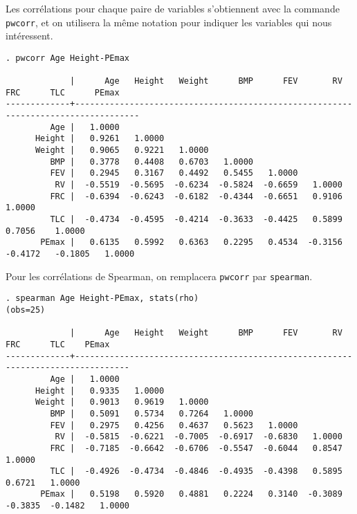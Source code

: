 Les corrélations pour chaque paire de variables s'obtiennent avec la
commande \texttt{pwcorr}, et on utilisera la même notation pour indiquer les
variables qui nous intéressent.
\begin{verbatim}
. pwcorr Age Height-PEmax

             |      Age   Height   Weight      BMP      FEV       RV      FRC      TLC      PEmax
-------------+-----------------------------------------------------------------------------------
         Age |   1.0000 
      Height |   0.9261   1.0000 
      Weight |   0.9065   0.9221   1.0000 
         BMP |   0.3778   0.4408   0.6703   1.0000 
         FEV |   0.2945   0.3167   0.4492   0.5455   1.0000 
          RV |  -0.5519  -0.5695  -0.6234  -0.5824  -0.6659   1.0000 
         FRC |  -0.6394  -0.6243  -0.6182  -0.4344  -0.6651   0.9106   1.0000 
         TLC |  -0.4734  -0.4595  -0.4214  -0.3633  -0.4425   0.5899   0.7056    1.0000 
       PEmax |   0.6135   0.5992   0.6363   0.2295   0.4534  -0.3156  -0.4172   -0.1805   1.0000
\end{verbatim}
Pour les corrélations de Spearman, on remplacera \texttt{pwcorr} par
\texttt{spearman}.
\begin{verbatim}
. spearman Age Height-PEmax, stats(rho)
(obs=25)

             |      Age   Height   Weight      BMP      FEV       RV      FRC      TLC    PEmax
-------------+---------------------------------------------------------------------------------
         Age |   1.0000 
      Height |   0.9335   1.0000 
      Weight |   0.9013   0.9619   1.0000 
         BMP |   0.5091   0.5734   0.7264   1.0000 
         FEV |   0.2975   0.4256   0.4637   0.5623   1.0000 
          RV |  -0.5815  -0.6221  -0.7005  -0.6917  -0.6830   1.0000 
         FRC |  -0.7185  -0.6642  -0.6706  -0.5547  -0.6044   0.8547   1.0000 
         TLC |  -0.4926  -0.4734  -0.4846  -0.4935  -0.4398   0.5895   0.6721   1.0000 
       PEmax |   0.5198   0.5920   0.4881   0.2224   0.3140  -0.3089  -0.3835  -0.1482   1.0000
\end{verbatim}

